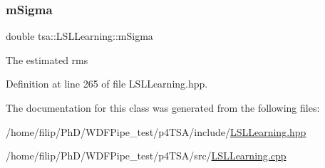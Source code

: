 \subsubsection{\texorpdfstring{m\+Sigma}{mSigma}}
{\footnotesize\ttfamily double tsa\+::\+L\+S\+L\+Learning\+::m\+Sigma\hspace{0.3cm}{\ttfamily [private]}}

The estimated rms 

Definition at line 265 of file L\+S\+L\+Learning.\+hpp.



The documentation for this class was generated from the following files\+:\begin{DoxyCompactItemize}
\item 
/home/filip/\+Ph\+D/\+W\+D\+F\+Pipe\+\_\+test/p4\+T\+S\+A/include/\hyperlink{_l_s_l_learning_8hpp}{L\+S\+L\+Learning.\+hpp}\item 
/home/filip/\+Ph\+D/\+W\+D\+F\+Pipe\+\_\+test/p4\+T\+S\+A/src/\hyperlink{_l_s_l_learning_8cpp}{L\+S\+L\+Learning.\+cpp}\end{DoxyCompactItemize}
